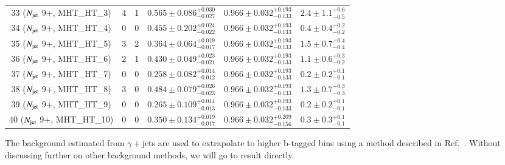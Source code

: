 \begin{table}[h]
\begin{tabular}{|c|rr|c|c|r|}
 33 ($N_{\rm jet}$ 9+, MHT\_HT\_3)    &    4 &     1 & $0.565\pm0.086^{+0.030}_{-0.027}$ & $0.966\pm0.032^{+0.193}_{-0.133}$ & $   2.4\pm 1.1^{+ 0.6}_{- 0.5}$ \\      
 34 ($N_{\rm jet}$ 9+, MHT\_HT\_4)    &    0 &     0 & $0.455\pm0.202^{+0.024}_{-0.022}$ & $0.966\pm0.032^{+0.193}_{-0.133}$ & $   0.4\pm 0.4^{+ 0.2}_{- 0.2}$ \\      
 35 ($N_{\rm jet}$ 9+, MHT\_HT\_5)    &    3 &     2 & $0.364\pm0.064^{+0.019}_{-0.017}$ & $0.966\pm0.032^{+0.193}_{-0.133}$ & $   1.5\pm 0.7^{+ 0.4}_{- 0.4}$ \\      
 36 ($N_{\rm jet}$ 9+, MHT\_HT\_6)    &    2 &     1 & $0.430\pm0.049^{+0.023}_{-0.021}$ & $0.966\pm0.032^{+0.193}_{-0.133}$ & $   1.1\pm 0.6^{+ 0.3}_{- 0.2}$ \\      
 37 ($N_{\rm jet}$ 9+, MHT\_HT\_7)    &    0 &     0 & $0.258\pm0.082^{+0.014}_{-0.012}$ & $0.966\pm0.032^{+0.193}_{-0.133}$ & $   0.2\pm 0.2^{+ 0.1}_{- 0.1}$ \\      
 38 ($N_{\rm jet}$ 9+, MHT\_HT\_8)    &    3 &     0 & $0.484\pm0.079^{+0.026}_{-0.023}$ & $0.966\pm0.032^{+0.193}_{-0.133}$ & $   1.3\pm 0.7^{+ 0.3}_{- 0.3}$ \\      
 39 ($N_{\rm jet}$ 9+, MHT\_HT\_9)    &    0 &     0 & $0.265\pm0.109^{+0.014}_{-0.013}$ & $0.966\pm0.032^{+0.193}_{-0.133}$ & $   0.2\pm 0.2^{+ 0.1}_{- 0.1}$ \\      
 40 ($N_{\rm jet}$ 9+, MHT\_HT\_10)   &    0 &     0 & $0.350\pm0.134^{+0.019}_{-0.017}$ & $0.966\pm0.032^{+0.209}_{-0.156}$ & $   0.3\pm 0.3^{+ 0.1}_{- 0.1}$ \\    
\hline
\end{tabular}
\end{table}



The background estimated from $\gamma +$jets are used to extrapolate to higher b-tagged bins using a method described in Ref.~\cite{CMS-PAS-SUS-16-014}. Without discussing further on other background methods, we will go to result directly. 






